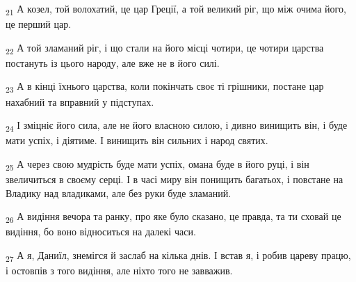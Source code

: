 \begin{tcolorbox}
\textsubscript{21} А козел, той волохатий, це цар Греції, а той великий ріг, що між очима його, це перший цар.
\end{tcolorbox}
\begin{tcolorbox}
\textsubscript{22} А той зламаний ріг, і що стали на його місці чотири, це чотири царства постануть із цього народу, але вже не в його силі.
\end{tcolorbox}
\begin{tcolorbox}
\textsubscript{23} А в кінці їхнього царства, коли покінчать своє ті грішники, постане цар нахабний та вправний у підступах.
\end{tcolorbox}
\begin{tcolorbox}
\textsubscript{24} І зміцніє його сила, але не його власною силою, і дивно винищить він, і буде мати успіх, і діятиме. І винищить він сильних і народ святих.
\end{tcolorbox}
\begin{tcolorbox}
\textsubscript{25} А через свою мудрість буде мати успіх, омана буде в його руці, і він звеличиться в своєму серці. І в часі миру він понищить багатьох, і повстане на Владику над владиками, але без руки буде зламаний.
\end{tcolorbox}
\begin{tcolorbox}
\textsubscript{26} А видіння вечора та ранку, про яке було сказано, це правда, та ти сховай це видіння, бо воно відноситься на далекі часи.
\end{tcolorbox}
\begin{tcolorbox}
\textsubscript{27} А я, Даниїл, знемігся й заслаб на кілька днів. І встав я, і робив цареву працю, і остовпів з того видіння, але ніхто того не завважив.
\end{tcolorbox}

